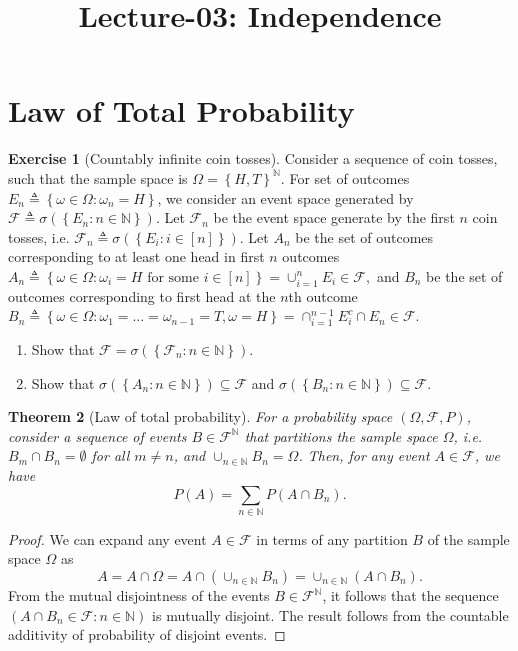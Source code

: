 \documentclass[letterpaper,10pt,english]{article}
\date{}
\title{Lecture-03: Independence}
\author{}
\theoremstyle{plain}
\newtheorem{thm}{Theorem}[section]
\theoremstyle{definition}
\newtheorem{exerc}[thm]{Exercise}
\theoremstyle{remark}
\newcommand{\EQ}[1]{\begin{equation*}#1\end{equation*}}
\newcommand{\set}[1]{\left\{#1\right\}}
\newcommand{\N}{\mathbb{N}}
\newcommand{\sF}{\mathscr{F}}
\begin{document}
\maketitle

\section{Law of Total Probability}
\begin{tcolorbox}
\begin{exerc}[Countably infinite coin tosses] 
\label{exerc:CountableCoinToss}
Consider a sequence of coin tosses, such that the sample space is $\Omega = \set{H,T}^\N$. 
For set of outcomes $E_n \triangleq \set{\omega \in \Omega: \omega_n = H}$, 
we consider an event space generated by $\sF \triangleq \sigma(\set{E_n: n\in \N})$. 
Let $\sF_n$ be the event space generate by the first $n$ coin tosses, 
i.e. $\sF_n \triangleq \sigma(\set{E_i: i \in [n]})$.  
Let $A_n$ be the set of outcomes corresponding to at least one head in first $n$ outcomes 
$
A_n \triangleq \set{\omega \in \Omega: \omega_i = H \text{ for some } i \in [n]} = \cup_{i=1}^nE_i \in \sF,
$
and $B_n$ be the set of outcomes corresponding to first head at the $n$th outcome
$
B_n \triangleq \set{\omega \in \Omega: \omega_1 = \dots = \omega_{n-1}= T, \omega = H} 
= \cap_{i=1}^{n-1}E_i^c\cap E_n \in \sF.
$
\begin{enumerate}
\item Show that $\sF = \sigma(\set{\sF_n: n \in \N})$. 
\item Show that $\sigma(\set{A_n: n \in \N}) \subseteq \sF$ and $\sigma(\set{B_n: n\in \N}) \subseteq \sF$. 
\end{enumerate}
\end{exerc}
\end{tcolorbox}
\begin{thm}[Law of total probability] 
For a probability space $(\Omega, \sF, P)$, 
consider a sequence of events $B\in \sF^\N$ that partitions the sample space $\Omega$, i.e. 
$B_m \cap B_n = \emptyset$ for all $m \neq n$, and $\cup_{n \in \N}B_n = \Omega$. 
Then, for any event $A \in \sF$, we have 
\EQ{
P(A) = \sum_{n \in \N}P(A \cap B_n).
}
\end{thm}
\begin{proof}
We can expand any event $A \in \sF$ in terms of any partition $B$ of the sample space $\Omega$ as 
\EQ{
A = A \cap \Omega = A \cap (\cup_{n \in \N}B_n) = \cup_{n \in \N}(A \cap B_n).
}
From the mutual disjointness of the events $B \in \sF^\N$, it follows that the sequence $(A \cap B_n \in \sF: n \in \N)$ is mutually disjoint. 
The result follows from the countable additivity of probability of disjoint events. 
\end{proof}
\end{document}
